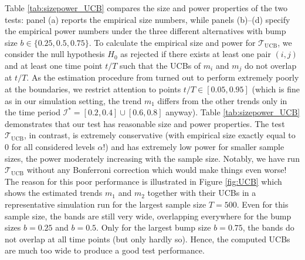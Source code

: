 \documentclass[12pt]{article}
\begin{document}
Table \ref{tab:sizepower_UCB} compares the size and power properties of the two tests: panel (a) reports the empirical size numbers, while panels (b)--(d) specify the empirical power numbers under the three different alternatives with bump size $b \in \{0.25,0.5,0.75\}$. To calculate the empirical size and power for $\mathcal{T}_{\text{UCB}}$, we consider the null hypothesis $H_0$ as rejected if there exists at least one pair $(i, j)$ and at least one time point $t/T$ such that the UCBs of $m_i$ and $m_j$ do not overlap at $t/T$. As the estimation procedure from \cite{Kim2016} turned out to perform extremely poorly at the boundaries,  we restrict attention to points $t/T \in [0.05, 0.95]$ (which is fine as in our simulation setting, the trend $m_1$ differs from the other trends only in the time period $\mathcal{I}^* = [0.2, 0.4] \cup [0.6, 0.8]$ anyway).
Table \ref{tab:sizepower_UCB} demonstrates that our test has reasonable size and power properties. The test $\mathcal{T}_{\text{UCB}}$, in contrast, is extremely conservative (with empirical size exactly equal to $0$ for all considered levels $\alpha$!) and has extremely low power for smaller sample sizes, the power moderately increasing with the sample size. Notably, we have run $\mathcal{T}_{\text{UCB}}$ without any Bonferroni correction which would make things even worse! The reason for this poor performance is illustrated in Figure \ref{fig:UCB} which shows the estimated trends $m_1$ and $m_2$ together with their UCBs in a representative simulation run for the largest sample size $T=500$. Even for this sample size, the bands are still very wide, overlapping everywhere for the bump sizes $b=0.25$ and $b=0.5$. Only for the largest bump size $b=0.75$, the bands do not overlap at all time points (but only hardly so). Hence, the computed UCBs are much too wide to produce a good test performance. 
\end{document}
